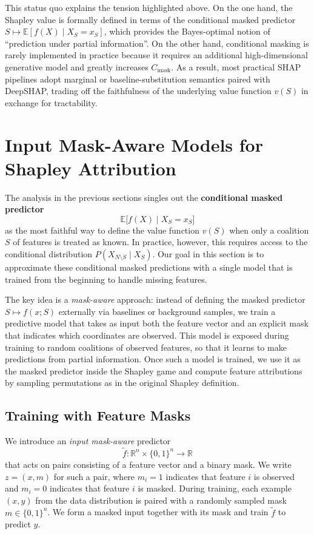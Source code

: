 \documentclass{article}
\begin{document}
This status quo explains the tension highlighted above. On the one hand, the Shapley value is formally defined in terms of the conditional masked predictor $S \mapsto \mathbb{E}[f(X)\mid X_S = x_S]$, which provides the Bayes-optimal notion of ``prediction under partial information''. On the other hand, conditional masking is rarely implemented in practice because it requires an additional high-dimensional generative model and greatly increases $C_{\text{mask}}$. As a result, most practical SHAP pipelines adopt marginal or baseline-substitution semantics paired with DeepSHAP, trading off the faithfulness of the underlying value function $v(S)$ in exchange for tractability.

\section{Input Mask-Aware Models for Shapley Attribution}
\label{sec:mask-aware}

The analysis in the previous sections singles out the \textbf{conditional masked predictor}
\[
\mathbb{E}\bigl[f(X) \mid X_S = x_S\bigr]
\]
as the most faithful way to define the value function $v(S)$ when only a coalition $S$ of features is treated as known.
In practice, however, this requires access to the conditional distribution $P(X_{N \setminus S} \mid X_S)$.
Our goal in this section is to approximate these conditional masked predictions with a single model that is trained from the beginning to handle missing features.

The key idea is a \emph{mask-aware} approach: instead of defining the masked predictor $S \mapsto f(x; S)$ externally via baselines or background samples, we train a predictive model that takes as input both the feature vector and an explicit mask that indicates which coordinates are observed.
This model is exposed during training to random coalitions of observed features, so that it learns to make predictions from partial information.
Once such a model is trained, we use it as the masked predictor inside the Shapley game and compute feature attributions by sampling permutations as in the original Shapley definition.

\subsection{Training with Feature Masks}

We introduce an \emph{input mask-aware} predictor
\[
\tilde f : \mathbb{R}^n \times \{0,1\}^n \to \mathbb{R}
\]
that acts on pairs consisting of a feature vector and a binary mask.
We write $z = (x,m)$ for such a pair, where $m_i = 1$ indicates that feature $i$ is observed and $m_i = 0$ indicates that feature $i$ is masked.
During training, each example $(x,y)$ from the data distribution is paired with a randomly sampled mask $m \in \{0,1\}^n$.
We form a masked input together with its mask and train $\tilde f$ to predict $y$.
\end{document}
